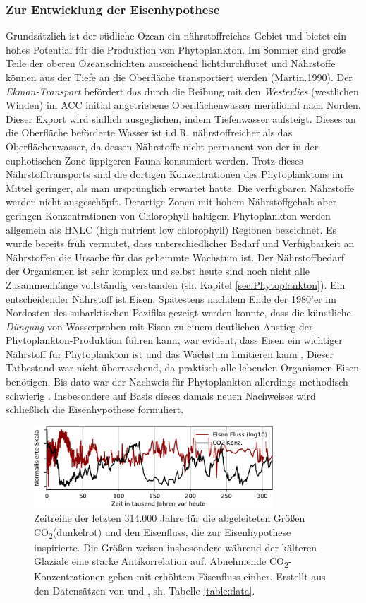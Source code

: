 \documentclass[12pt,a4paper,onecolumn,headheight=30pt]{scrartcl}
\newcommand{\cotwo}{CO\textsubscript{2}}
\begin{document}
\subsubsection{Zur Entwicklung der Eisenhypothese}
Grundsätzlich ist der südliche Ozean ein nährstoffreiches Gebiet und
bietet ein hohes Potential für die Produktion von Phytoplankton. Im Sommer sind große Teile der oberen Ozeanschichten ausreichend lichtdurchflutet und Nährstoffe können aus der Tiefe an die Oberfläche transportiert werden (Martin.1990). Der \textit{Ekman-Transport} befördert das durch die Reibung mit den \textit{Westerlies} (westlichen Winden) im ACC initial angetriebene Oberflächenwasser meridional nach Norden. Dieser Export wird südlich ausgeglichen, indem Tiefenwasser aufsteigt. Dieses an die Oberfläche beförderte Wasser ist i.d.R. nährstoffreicher als das Oberflächenwasser, da dessen Nährstoffe nicht permanent von der in der euphotischen Zone üppigeren Fauna konsumiert werden. Trotz dieses Nährstofftransports sind die dortigen Konzentrationen des Phytoplanktons im Mittel geringer, als man ursprünglich erwartet hatte. Die verfügbaren Nährstoffe werden nicht ausgeschöpft. Derartige Zonen mit hohem Nährstoffgehalt aber geringen Konzentrationen von Chlorophyll-haltigem Phytoplankton werden allgemein als HNLC (high nutrient low chlorophyll) Regionen bezeichnet. Es wurde bereits früh vermutet, dass unterschiedlicher Bedarf und Verfügbarkeit an Nährstoffen die Ursache für das gehemmte Wachstum ist. Der Nährstoffbedarf der Organismen ist sehr komplex und selbst heute sind noch nicht alle Zusammenhänge vollständig verstanden (sh. Kapitel \ref{sec:Phytoplankton}). Ein entscheidender Nährstoff ist Eisen. Spätestens nachdem Ende der 1980'er im Nordosten des subarktischen Pazifiks gezeigt werden konnte, dass die künstliche \textit{Düngung} von Wasserproben mit Eisen zu einem deutlichen Anstieg der Phytoplankton-Produktion führen kann, war evident, dass Eisen ein wichtiger Nährstoff für Phytoplankton ist und das Wachstum limitieren kann \citep{Martin.1988}. Dieser Tatbestand war nicht überraschend, da praktisch alle lebenden Organismen Eisen benötigen. Bis dato war der Nachweis für Phytoplankton allerdings methodisch schwierig \citep{Martin.1988}. Insbesondere auf Basis dieses damals neuen Nachweises wird schließlich die Eisenhypothese formuliert.
\begin{figure}[htbp]
\includegraphics[width=0.8\textwidth]{bilder/co2_iron.pdf}
\caption{Zeitreihe der letzten 314.000 Jahre für die abgeleiteten Größen \cotwo (dunkelrot) und den Eisenfluss, die zur Eisenhypothese inspirierte. Die Größen weisen insbesondere während der kälteren Glaziale eine starke Antikorrelation auf. Abnehmende \cotwo -Konzentrationen gehen mit erhöhtem Eisenfluss einher. Erstellt aus den Datensätzen von \cite{Bereiter.2015} und \cite{Vallelonga.2013}, sh. Tabelle \ref{table:data}.}   \label{fig:co2iron}
\end{figure}
\end{document}
